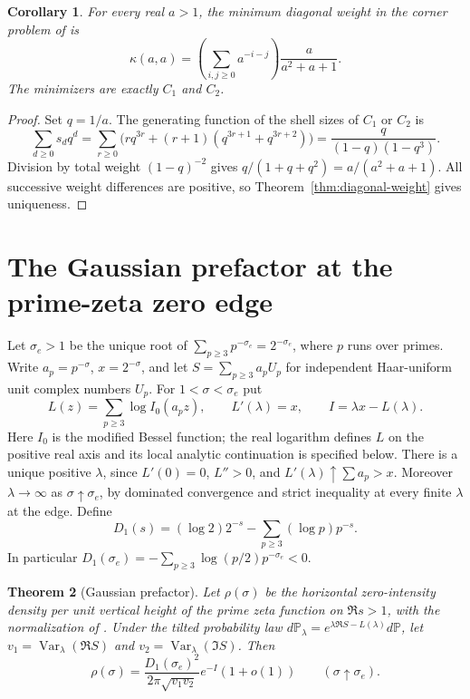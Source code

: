\documentclass[11pt]{article}
\newtheorem{theorem}{Theorem}[section]
\newtheorem{corollary}[theorem]{Corollary}
\begin{document}
\begin{corollary}\label{cor:diagonal-corners}
For every real $a>1$, the minimum diagonal weight in the corner problem
of \cite{vm140} is
\[
 \kappa(a,a)=\left(\sum_{i,j\ge0}a^{-i-j}\right)
                 \frac{a}{a^2+a+1}.
\]
The minimizers are exactly $C_1$ and $C_2$.
\end{corollary}
\begin{proof}
Set $q=1/a$. The generating function of the shell sizes of $C_1$ or
$C_2$ is
\[
 \sum_{d\ge0}s_d q^d
 =\sum_{r\ge0}\bigl(rq^{3r}+(r+1)(q^{3r+1}+q^{3r+2})\bigr)
 =\frac{q}{(1-q)(1-q^3)}.
\]
Division by total weight $(1-q)^{-2}$ gives
$q/(1+q+q^2)=a/(a^2+a+1)$. All successive weight differences are
positive, so Theorem~\ref{thm:diagonal-weight} gives uniqueness.
\end{proof}

\section{The Gaussian prefactor at the prime-zeta zero edge}
\label{sec:primeedge}

Let $\sigma_e>1$ be the unique root of
$\sum_{p\ge3}p^{-\sigma_e}=2^{-\sigma_e}$, where $p$ runs over primes.
Write $a_p=p^{-\sigma}$, $x=2^{-\sigma}$, and let
$S=\sum_{p\ge3}a_pU_p$ for independent Haar-uniform unit complex
numbers $U_p$. For $1<\sigma<\sigma_e$ put
\[
 L(z)=\sum_{p\ge3}\log I_0(a_pz),\qquad
 L'(\lambda)=x,\qquad I=\lambda x-L(\lambda).
\]
Here $I_0$ is the modified Bessel function; the real logarithm defines
$L$ on the positive real axis and its local analytic continuation is
specified below. There is a unique positive $\lambda$, since $L'(0)=0$,
$L''>0$, and $L'(\lambda)\uparrow\sum a_p>x$. Moreover
$\lambda\to\infty$ as $\sigma\uparrow\sigma_e$, by dominated convergence
and strict inequality at every finite $\lambda$ at the edge. Define
\[
 D_1(s)=(\log2)2^{-s}-\sum_{p\ge3}(\log p)p^{-s}.
\]
In particular $D_1(\sigma_e)=-\sum_{p\ge3}\log(p/2)p^{-\sigma_e}<0$.

\begin{theorem}[Gaussian prefactor]
Let $\rho(\sigma)$ be the horizontal zero-intensity density per unit vertical height of the
prime zeta function on $\Re s>1$, with the normalization of
\cite{vm004}. Under the tilted probability law
$d\mathbb P_\lambda=e^{\lambda\Re S-L(\lambda)}d\mathbb P$, let
$v_1=\operatorname{Var}_\lambda(\Re S)$ and
$v_2=\operatorname{Var}_\lambda(\Im S)$. Then
\[
 \rho(\sigma)=
 \frac{D_1(\sigma_e)^2}{2\pi\sqrt{v_1v_2}}e^{-I}(1+o(1))
 \qquad(\sigma\uparrow\sigma_e).
\]
\end{theorem}
\end{document}
